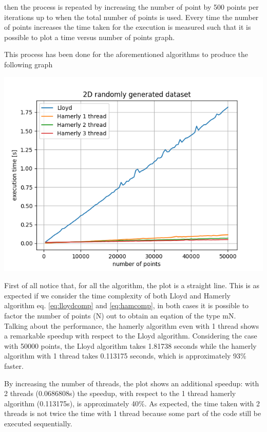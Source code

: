 \documentclass{report}
\begin{document}
\begin{minipage}[b]{0.48\textwidth}
  then the process is repeated by increasing the number of point by 500 points per iterations up to when the total number of points is used. Every time the number of points increases the time taken for the execution is measured such that it is possible to plot a time versus number of points graph.

  This process has been done for the aforementioned algorithms to produce the following graph
  
  \begin{center} 
    \includegraphics[width = 1\textwidth]{imgs/lh123_2Drnd.png}
    \label{fig:lh123_2Drnd}
  \end{center}

  First of all notice that, for all the algorithm, the plot is a straight line. This is as expected if we consider the time complexity of both Lloyd and Hamerly algorithm eq. \ref{eq:lloydcomp} and \ref{eq:hamcomp}, in both cases it is possible to factor the number of points (N) out to obtain an eqation of the type mN.\\

  Talking about the performance, the hamerly algorithm even with 1 thread shows a remarkable speedup with respect to the Lloyd algorithm. Considering the case with 50000 points, the Lloyd algorithm takes 1.81738 seconds while the hamerly algorithm with 1 thread takes 0.113175 seconds, which is approximately 93\% faster. 
  
  By increasing the number of threads, the plot shows an additional speedup: with 2 threads (0.0686808s) the speedup, with respect to the 1 thread hamerly algorithm (0.113175s), is approximately 40\%. As expected, the time taken with 2 threads is not twice the time with 1 thread because some part of the code still be executed sequentially.


\end{minipage}
\end{document}
